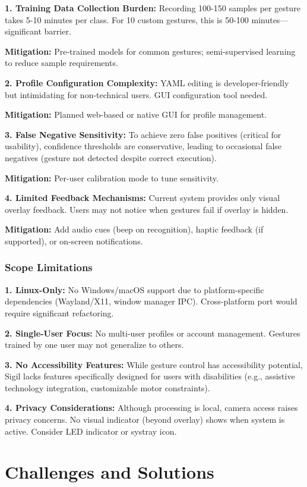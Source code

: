 \documentclass[11pt,a4paper]{article}
\begin{document}
\textbf{1. Training Data Collection Burden:}
Recording 100-150 samples per gesture takes 5-10 minutes per class. For 10 custom gestures, this is 50-100 minutes—significant barrier.

\textbf{Mitigation:} Pre-trained models for common gestures; semi-supervised learning to reduce sample requirements.

\textbf{2. Profile Configuration Complexity:}
YAML editing is developer-friendly but intimidating for non-technical users. GUI configuration tool needed.

\textbf{Mitigation:} Planned web-based or native GUI for profile management.

\textbf{3. False Negative Sensitivity:}
To achieve zero false positives (critical for usability), confidence thresholds are conservative, leading to occasional false negatives (gesture not detected despite correct execution).

\textbf{Mitigation:} Per-user calibration mode to tune sensitivity.

\textbf{4. Limited Feedback Mechanisms:}
Current system provides only visual overlay feedback. Users may not notice when gestures fail if overlay is hidden.

\textbf{Mitigation:} Add audio cues (beep on recognition), haptic feedback (if supported), or on-screen notifications.

\subsubsection{Scope Limitations}

\textbf{1. Linux-Only:}
No Windows/macOS support due to platform-specific dependencies (Wayland/X11, window manager IPC). Cross-platform port would require significant refactoring.

\textbf{2. Single-User Focus:}
No multi-user profiles or account management. Gestures trained by one user may not generalize to others.

\textbf{3. No Accessibility Features:}
While gesture control has accessibility potential, Sigil lacks features specifically designed for users with disabilities (e.g., assistive technology integration, customizable motor constraints).

\textbf{4. Privacy Considerations:}
Although processing is local, camera access raises privacy concerns. No visual indicator (beyond overlay) shows when system is active. Consider LED indicator or systray icon.

\section{Challenges and Solutions}
\end{document}
